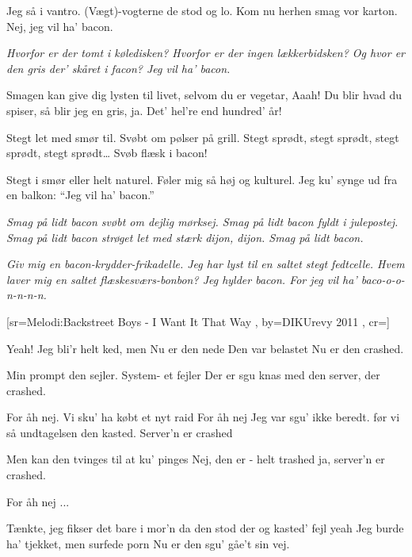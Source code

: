 \documentclass[pdftex,12pt]{article}
\begin{document}
\begin{songs}{}
\endverse
\beginverse
Jeg så i vantro.
(Vægt)-vogterne de stod og lo.
Kom nu herhen smag vor karton.
Nej, jeg vil ha’ bacon.

\endverse
\beginverse
\emph{Hvorfor er
der tomt i køledisken?
Hvorfor er
der ingen lækkerbidsken?
Og hvor er
den gris der’ skåret i facon?
Jeg vil ha’ bacon.}

\endverse
\beginverse
Smagen kan give dig lysten til livet,
selvom du er vegetar, Aaah!
Du blir hvad du spiser, så blir jeg en gris, ja.
Det’ hel’re end hundred’ år!

\endverse
\beginverse
Stegt let med smør til.
Svøbt om pølser på grill.
Stegt sprødt,
stegt sprødt, stegt sprødt, stegt sprødt\ldots
Svøb flæsk i bacon!

\endverse
\beginverse
Stegt i smør eller helt naturel.
Føler mig så høj og kulturel.
Jeg ku’ synge ud fra en balkon:
``Jeg vil ha’ bacon.''

\endverse
\beginverse
\emph{Smag på lidt
bacon svøbt om dejlig mørksej.
Smag på lidt
bacon fyldt i julepostej.
Smag på lidt
bacon strøget let med stærk dijon, dijon.
Smag på lidt bacon.}

\endverse
\beginverse
\emph{Giv mig en
bacon-krydder-frikadelle.
Jeg har lyst
til en saltet stegt fedtcelle.
Hvem laver
mig en saltet flæskesværs-bonbon?
Jeg hylder bacon.
For jeg vil ha’ baco-o-o-n-n-n-n.}

\endverse
\endsong



[sr={Melodi:Backstreet Boys - I Want It That Way}
,
by={DIKUrevy 2011}
,
cr={}]\hypertarget{Server'n er Crashed}{}
\label{song79}

\beginverse
Yeah!
Jeg bli'r
helt ked, men
Nu er
den nede
Den var belastet
Nu er den crashed.

\endverse
\beginverse
Min prompt
den sejler.
System-
et fejler
Der er sgu knas med
den server, der crashed.

\endverse
\beginverse
For åh nej.
Vi sku' ha købt et nyt raid
For åh nej
Jeg var sgu' ikke beredt.
før vi så
undtagelsen den kasted.
Server'n er crashed

\endverse
\beginverse
Men kan
den tvinges
til at
ku' pinges
Nej, den er - helt trashed
ja, server'n er crashed.

\endverse
\beginverse
For åh nej ...

\endverse
\beginverse
Tænkte, jeg fikser det bare i mor'n
da den stod der og kasted' fejl
yeah
Jeg burde ha' tjekket, men surfede porn
Nu er den sgu' gåe't sin vej.


\end{songs}
\end{document}
